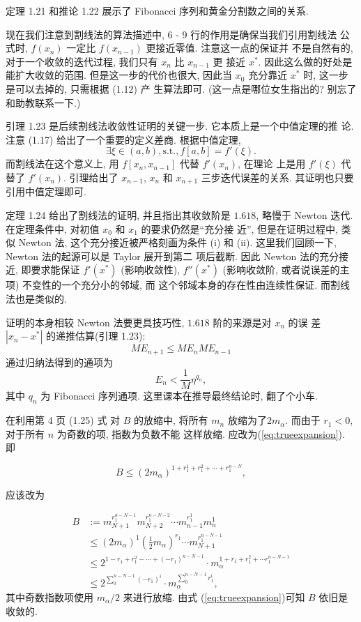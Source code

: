 \documentclass[a4paper]{ctexart}
\begin{document}
定理 1.21 和推论 1.22 展示了 Fibonacci 序列和黄金分割数之间的关系.

现在我们注意到割线法的算法描述中, 6 - 9 行的作用是确保当我们引用割线法
公式时, $f(x_n)$ 一定比 $f(x_{n - 1})$ 更接近零值. 注意这一点的保证并
不是自然有的, 对于一个收敛的迭代过程, 我们只有 $x_n$ 比 $x_{n - 1}$ 更
接近 $x^*$. 因此这么做的好处是能扩大收敛的范围. 但是这一步的代价也很大,
因此当 $x_0$ 充分靠近 $x^*$ 时, 这一步是可以去掉的, 只需根据 (1.12) 产
生算法即可. (这一点是哪位女生指出的? 别忘了和助教联系一下.)

引理 1.23 是后续割线法收敛性证明的关键一步. 它本质上是一个中值定理的推
论. 注意 (1.17) 给出了一个重要的定义差商. 根据中值定理,
$$\exists \xi \in (a, b), \mathrm{s. t.},
f[a, b] = f'(\xi).
$$
而割线法在这个意义上, 用 $f[x_n, x_{n - 1}]$ 代替 $f'(x_n)$, 在理论
上是用 $f'(\xi)$ 代替了 $f'(x_n)$. 引理给出了 $x_{n - 1}$, $x_n$ 和
$x_{n + 1}$ 三步迭代误差的关系. 其证明也只要引用中值定理即可. 

定理 1.24 给出了割线法的证明, 并且指出其收敛阶是 $1.618$, 略慢于
Newton 迭代. 在定理条件中, 对初值 $x_0$ 和 $x_1$ 的要求仍然是``充分接
近'', 但是在证明过程中, 类似 Newton 法, 这个充分接近被严格刻画为条件
(i) 和 (ii). 这里我们回顾一下, Newton 法的起源可以是 Taylor 展开到第二
项后截断. 因此 Newton 法的充分接近, 即要求能保证 $f'(x^*)$ (影响收敛性),
$f''(x^*)$ (影响收敛阶, 或者说误差的主项) 不变性的一个充分小的邻域, 而
这个邻域本身的存在性由连续性保证. 而割线法也是类似的.

证明的本身相较 Newton 法要更具技巧性, $1.618$ 阶的来源是对 $x_n$ 的误
差 $|x_n - x^*|$ 的递推估算(引理 1.23):
$$
ME_{n + 1} \leq ME_nME_{n - 1}
$$
通过归纳法得到的通项为
$$
E_n < \frac{1}{M} \eta^{q_n},
$$
其中 $q_n$ 为 Fibonacci 序列通项. 这里课本在推导最终结论时, 翻了个小车. 

在利用第 4 页 (1.25) 式 对 $B$ 的放缩中, 将所有 $m_n$ 放缩为了$2
m_{\alpha}$. 而由于 $r_1 < 0$, 对于所有 $n$ 为奇数的项, 指数为负数不能
这样放缩. 应改为(\ref{eq:trueexpansion}). 即

\begin{equation}
  B \leq \left(2 m_\alpha\right)^{1 + r_1^1 + r_1^2 + \cdots + r_1^{n - N}},
\end{equation}

应该改为

\begin{equation}
  \label{eq:trueexpansion}
  \begin{array}{ll}
    B &:=m_{N+1}^{r_1^{n-N-1}}m_{N+2}^{r_1^{n-N-2}}\cdots
    m_{n-1}^{r_1^1}m_n^1\\
    &\leq
    (2m_{\alpha})^{1}(\frac{1}{2}m_{\alpha})^{r_1}\cdots
    m_{N+1}^{r_1^{n-N-1}}\\
    &\leq 2^{1 - r_1 + r_1^2 -\cdots +
      (-r_1)^{n - N - 1}}\cdot m_{\alpha}^{1+r_1+r_1^2+\cdots r_1^{n -
        N - 1}}\\ &\leq 2^{\sum_{0}^{n - N - 1}(-r_1)^i}\cdot
    m_{\alpha}^{\sum_{0}^{n - N - 1}r_1^i},
  \end{array}
\end{equation}
其中奇数指数项使用 $m_{\alpha}/2$ 来进行放缩. 由式
(\ref{eq:trueexpansion})可知 $B$ 依旧是收敛的.
\end{document}
